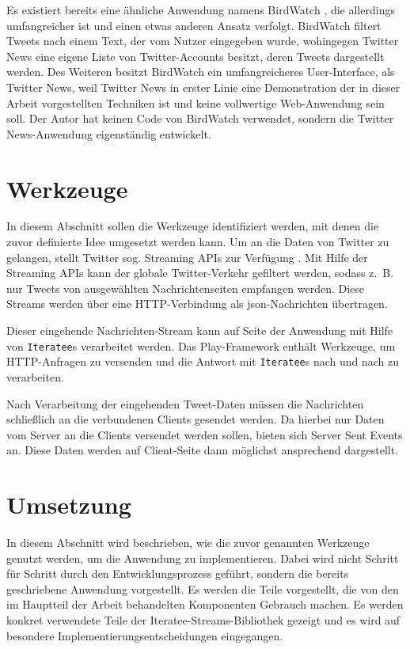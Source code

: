 Es existiert bereits eine ähnliche Anwendung namens BirdWatch \cite[vgl.][]{bird_watch}, die allerdings umfangreicher ist und einen etwas anderen Ansatz verfolgt.
BirdWatch filtert Tweets nach einem Text, der vom Nutzer eingegeben wurde, wohingegen Twitter News eine eigene Liste von Twitter-Accounts besitzt, deren Tweets dargestellt werden.
Des Weiteren besitzt BirdWatch ein umfangreicheres User-Interface, als Twitter News, weil Twitter News in erster Linie eine Demonstration der in dieser Arbeit vorgestellten Techniken ist und keine vollwertige Web-Anwendung sein soll.
Der Autor hat keinen Code von BirdWatch verwendet, sondern die Twitter News-Anwendung eigenständig entwickelt.


\section{Werkzeuge} %
\label{sec:werkzeuge}

In diesem Abschnitt sollen die Werkzeuge identifiziert werden, mit denen die zuvor definierte Idee umgesetzt werden kann.
Um an die Daten von Twitter zu gelangen, stellt Twitter sog. Streaming APIs zur Verfügung \cite[vgl.][]{twitter_streaming_apis}.
Mit Hilfe der Streaming APIs kann der globale Twitter-Verkehr gefiltert werden, sodass z.~B. nur Tweets von ausgewählten Nachrichtenseiten empfangen werden.
Diese Streams werden über eine HTTP-Verbindung als \gls{json}-Nachrichten übertragen.

Dieser eingehende Nachrichten-Stream kann auf Seite der Anwendung mit Hilfe von \lstinline|Iteratee|s verarbeitet werden.
Das Play-Framework enthält Werkzeuge, um HTTP-Anfragen zu versenden und die Antwort mit \lstinline|Iteratee|s nach und nach zu verarbeiten.

Nach Verarbeitung der eingehenden Tweet-Daten müssen die Nachrichten schließlich an die verbundenen Clients gesendet werden.
Da hierbei nur Daten vom Server an die Clients versendet werden sollen, bieten sich Server Sent Events an.
Diese Daten werden auf Client-Seite dann möglichst ansprechend dargestellt.


\section{Umsetzung} %
\label{sec:umsetzung}

In diesem Abschnitt wird beschrieben, wie die zuvor genannten Werkzeuge genutzt werden, um die Anwendung zu implementieren.
Dabei wird nicht Schritt für Schritt durch den Entwicklungsprozess geführt, sondern die bereits geschriebene Anwendung vorgestellt.
Es werden die Teile vorgestellt, die  von den im Hauptteil der Arbeit behandelten Komponenten Gebrauch machen.
Es werden konkret verwendete Teile der Iteratee-Streams-Bibliothek gezeigt und es wird auf besondere Implementierungsentscheidungen eingegangen.

